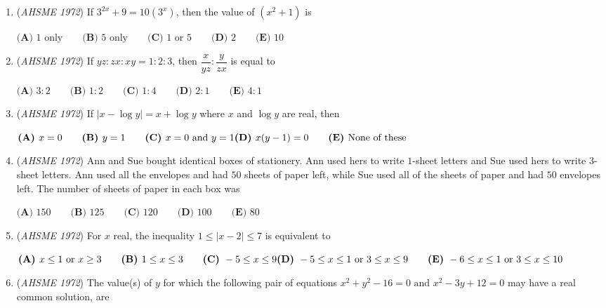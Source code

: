 \begin{enumerate}
 $\textbf{(A) } 3^{1/3},\ 2^{1/2}\quad  \textbf{(B) } 3^{1/3},\ 8^{1/8}\quad  \textbf{(C) } 3^{1/3},\ 9^{1/9}\quad  \textbf{(D) } 8^{1/8},\ 9^{1/9}\quad \\  \text{(E) None of these}$


	\item (\textit{AHSME 1972}) If $3^{2x}+9=10\left(3^{x}\right)$, then the value of $(x^2+1)$ is 


 $\textbf{(A) }1\text{ only}\qquad \textbf{(B) }5\text{ only}\qquad \textbf{(C) }1\text{ or }5\qquad \textbf{(D) }2\qquad \textbf{(E) }10$


	\item (\textit{AHSME 1972}) If $yz:zx:xy=1:2:3$, then $\dfrac{x}{yz}:\dfrac{y}{zx}$ is equal to


 $\textbf{(A) }3:2\qquad \textbf{(B) }1:2\qquad \textbf{(C) }1:4\qquad \textbf{(D) }2:1\qquad  \textbf{(E) }4:1$


	\item (\textit{AHSME 1972}) If $|x-\log y|=x+\log y$ where $x$ and $\log y$ are real, then


 $\textbf{(A) }x=0\qquad \textbf{(B) }y=1\qquad \textbf{(C) }x=0\text{ and }y=1\qquad\\ \textbf{(D) }x(y-1)=0\qquad  \textbf{(E) }\text{None of these}$


	\item (\textit{AHSME 1972}) Ann and Sue bought identical boxes of stationery. Ann used hers to write $1$-sheet letters and Sue used hers to write $3$-sheet letters. 
Ann used all the envelopes and had $50$ sheets of paper left, while Sue used all of the sheets of paper and had $50$ envelopes left. 
The number of sheets of paper in each box was 


 $\textbf{(A) } 150 \qquad \textbf{(B) } 125 \qquad \textbf{(C) } 120 \qquad \textbf{(D) } 100 \qquad     \textbf{(E) } 80 \qquad$


	\item (\textit{AHSME 1972}) For $x$ real, the inequality $1\le |x-2|\le 7$ is equivalent to


 $\textbf{(A) }x\le 1\text{ or }x\ge 3\qquad \textbf{(B) }1\le x\le 3\qquad \textbf{(C) }-5\le x\le 9\qquad \\ \textbf{(D) }-5\le x\le 1\text{ or }3\le x\le 9\qquad  \textbf{(E) }-6\le x\le 1\text{ or }3\le x\le 10$


	\item (\textit{AHSME 1972}) The value(s) of $y$ for which the following pair of equations $x^2+y^2-16=0\text{ and }x^2-3y+12=0$ may have a real common solution, are



\end{enumerate}
